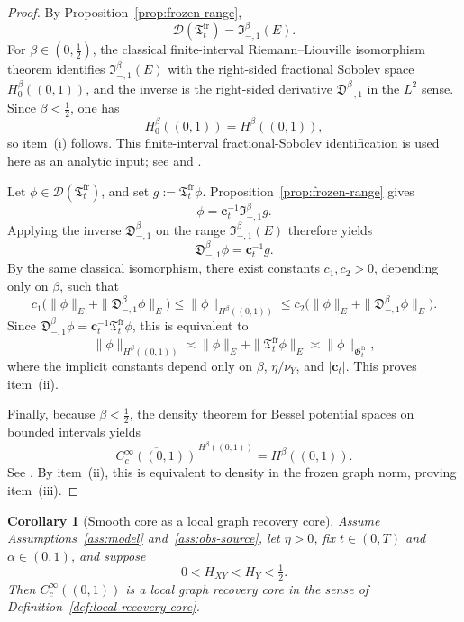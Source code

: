 \documentclass[11pt,a4paper]{amsart}
\theoremstyle{plain}
\newtheorem{corollary}[theorem]{Corollary}
\theoremstyle{definition}
\theoremstyle{remark}
\begin{document}
\begin{proof}
By Proposition~\ref{prop:frozen-range},
\[
\mathcal D(\mathfrak T_t^{\mathrm{fr}})
=
\mathfrak I_{-,1}^{\beta}(E).
\]
For \(\beta\in(0,\tfrac12)\), the classical finite-interval Riemann--Liouville isomorphism
theorem identifies \(\mathfrak I_{-,1}^{\beta}(E)\) with the right-sided fractional Sobolev space
\(H_0^\beta((0,1))\), and the inverse is the right-sided derivative
\(\mathfrak D_{-,1}^{\beta}\) in the \(L^2\) sense. Since \(\beta<\tfrac12\), one has
\[
H_0^\beta((0,1))=H^\beta((0,1)),
\]
so item~(i) follows. This finite-interval fractional-Sobolev identification is used here
as an analytic input; see \cite[Ch.~13]{SKM93} and
\cite[Ch.~2]{Triebel83}.

Let \(\phi\in\mathcal D(\mathfrak T_t^{\mathrm{fr}})\), and set \(g:=\mathfrak T_t^{\mathrm{fr}}\phi\).
Proposition~\ref{prop:frozen-range} gives
\[
\phi=\mathbf c_t^{-1}\mathfrak I_{-,1}^{\beta}g.
\]
Applying the inverse \(\mathfrak D_{-,1}^{\beta}\) on the range
\(\mathfrak I_{-,1}^{\beta}(E)\) therefore yields
\[
\mathfrak D_{-,1}^{\beta}\phi=\mathbf c_t^{-1}g.
\]
By the same classical isomorphism, there exist constants \(c_1,c_2>0\), depending only on
\(\beta\), such that
\[
c_1\bigl(\|\phi\|_E+\|\mathfrak D_{-,1}^{\beta}\phi\|_E\bigr)
\le
\|\phi\|_{H^\beta((0,1))}
\le
c_2\bigl(\|\phi\|_E+\|\mathfrak D_{-,1}^{\beta}\phi\|_E\bigr).
\]
Since \(\mathfrak D_{-,1}^{\beta}\phi=\mathbf c_t^{-1}\mathfrak T_t^{\mathrm{fr}}\phi\), this is
equivalent to
\[
\|\phi\|_{H^\beta((0,1))}
\asymp
\|\phi\|_E+\|\mathfrak T_t^{\mathrm{fr}}\phi\|_E
\asymp
\|\phi\|_{\mathfrak G_t^{\mathrm{fr}}},
\]
where the implicit constants depend only on \(\beta\), \(\eta/\nu_Y\), and \(|\mathbf c_t|\). This
proves item~(ii).

Finally, because \(\beta<\tfrac12\), the density theorem for Bessel potential spaces on
bounded intervals yields
\[
\overline{C_c^\infty((0,1))}^{\,H^\beta((0,1))}
=
H^\beta((0,1)).
\]
See \cite[Ch.~2]{Triebel83}. By item~(ii), this is equivalent to density in the frozen graph
norm, proving item~(iii).
\end{proof}

\begin{corollary}[Smooth core as a local graph recovery core]
\label{cor:smooth-core-recovery}
Assume Assumptions~\ref{ass:model} and~\ref{ass:obs-source}, let \(\eta>0\), fix \(t\in(0,T)\)
and \(\alpha\in(0,1)\), and suppose
\[
0<H_{XY}<H_Y<\tfrac12.
\]
Then \(C_c^\infty((0,1))\) is a local graph recovery core in the sense of
Definition~\ref{def:local-recovery-core}.
\end{corollary}
\end{document}
